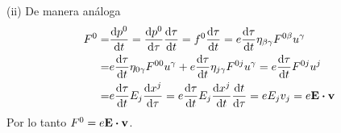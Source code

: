 \documentclass[11pt]{article}
\begin{document}
(ii) De manera análoga
\begin{align}
\begin{split}
F^0=&\dv{p^0}{t}=\dv{p^0}{\tau}\dv{\tau}{t}=f^0\dv{\tau}{t}=e\dv{\tau}{t}\eta_{\beta\gamma}F^{0\beta}u^\gamma\\
=&e\dv{\tau}{t}\eta_{0\gamma}F^{00}u^\gamma+e\dv{\tau}{t}\eta_{j\gamma}F^{0j}u^\gamma=e\dv{\tau}{t}F^{0j}u^j\\
=&e\dv{\tau}{t}E_j\dv{x^j}{\tau}=e\dv{\tau}{t}E_j\dv{x^j}{t}\dv{t}{\tau}=eE_jv_j=e\vb{E}\vdot\vb{v}
\end{split}
\end{align}
Por lo tanto $F^0=e\vb{E}\vdot\vb{v}$.
\end{document}
